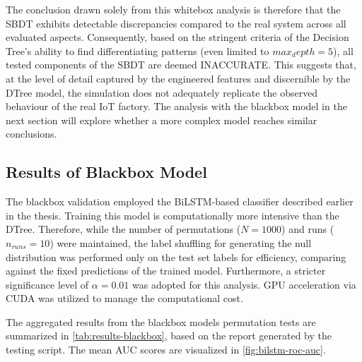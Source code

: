 The conclusion drawn solely from this whitebox analysis is therefore that the SBDT exhibits detectable discrepancies compared to the real system across all evaluated aspects. Consequently, based on the stringent criteria of the Decision Tree's ability to find differentiating patterns (even limited to $max_depth=5$), all tested components of the SBDT are deemed INACCURATE. This suggests that, at the level of detail captured by the engineered features and discernible by the DTree model, the simulation does not adequately replicate the observed behaviour of the real IoT factory. The analysis with the blackbox model in the next section will explore whether a more complex model reaches similar conclusions.

\subsection*{Results of Blackbox Model}

The blackbox validation employed the BiLSTM-based classifier described earlier in the thesis. Training this model is computationally more intensive than the DTree. Therefore, while the number of permutations ($N=1000$) and runs ($n_{runs}=10$) were maintained, the label shuffling for generating the null distribution was performed only on the test set labels for efficiency, comparing against the fixed predictions of the trained model. Furthermore, a stricter significance level of $\alpha = 0.01$ was adopted for this analysis. GPU acceleration via CUDA \autocite{NVIDIA_CUDA} was utilized to manage the computational cost.

The aggregated results from the blackbox models permutation tests are summarized in \autoref{tab:results-blackbox}, based on the report generated by the testing script. The mean AUC scores are visualized in \autoref{fig:bilstm-roc-auc}.

